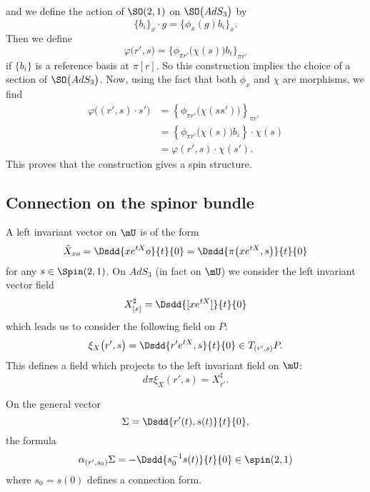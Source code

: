 and we define the action of $\SO(2,1)$ on $\SO\big( AdS_3 \big)$ by
\begin{equation}
	\{ b_{i} \}_{x}\cdot g=\{ \phi_{x}(g)b_{i} \}_{x}.
\end{equation}
Then we define
\begin{equation}
	\varphi\big( r',s \big)=\{ \phi_{\pi r'}\big( \chi(s) \big)b_{i} \}_{\pi r'}
\end{equation}
if $\{ b_{i} \}$ is a reference basis at $\pi[r]$. So this construction implies the choice of a section of $\SO\big( AdS_3 \big)$. Now, using the fact that both $\phi_{x}$ and $\chi$ are morphisms, we find
\begin{equation}
	\begin{split}
		\varphi\big( (r',s)\cdot s' \big)&=\left\{ \phi_{\pi r'}\big( \chi(ss') \big) \right\}_{\pi r'}\\
		&=\left\{ \phi_{\pi r'}\big( \chi(s) \big)b_{i} \right\}\cdot\chi(s)\\
		&=\varphi(r',s)\cdot\chi(s').
	\end{split}
\end{equation}
This proves that the construction gives a spin structure.

\subsection{Connection on the spinor bundle}

A left invariant vector on $\mU$ is of the form
\[
	\tilde X_{xo}=\Dsdd{ x e^{tX}o }{t}{0}
	=\Dsdd{ \pi\big( x e^{tX},s \big) }{t}{0}
\]
for any $s\in\Spin(2,1)$. On $AdS_3$ (in fact on $\mU$) we consider the left invariant vector field
\begin{equation}
	X^{\sharp}_{[x]}=\Dsdd{ [x e^{tX}] }{t}{0}
\end{equation}
which leads us to consider the following field on $P$:
\begin{equation}
	\xi_{X}\big( r',s \big)=\Dsdd{ r' e^{tX},s }{t}{0}\in T_{( r',s )}P.
\end{equation}
This defines a field which projects to the left invariant field on $\mU$:
\begin{equation}   \label{eq_xiXprojXsharp}
	d\pi\xi_{X}(r',s)=X^{\sharp}_{r'}.
\end{equation}


\begin{lemma}
	On the general vector
	\begin{equation}   \label{eq_gebevectSig}
		\Sigma=\Dsdd{ r'(t),s(t) }{t}{0},
	\end{equation}
	the formula
	\begin{equation}
		\alpha_{(r',s_{0})}\Sigma=-\Dsdd{ s_{0}^{-1}s(t) }{t}{0}\in\spin(2,1)
	\end{equation}
	where $s_{0}=s(0)$ defines a connection form.

\end{lemma}

